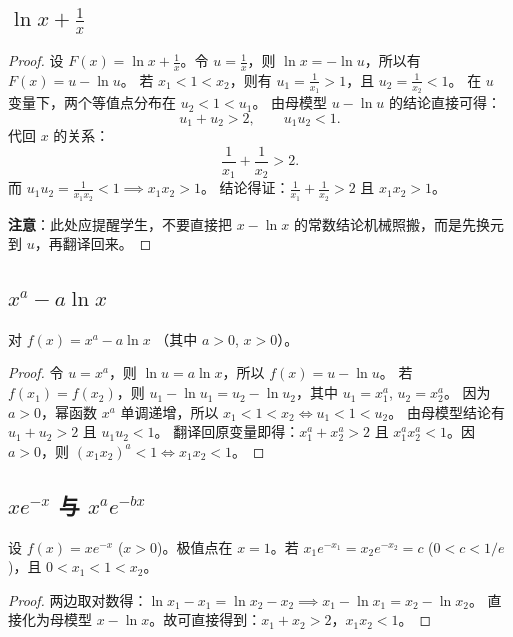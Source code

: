 \documentclass[11pt,a4paper]{ctexart}
\begin{document}
\subsection{$\ln x+\frac{1}{x}$}
\begin{proof}
设 $F(x) = \ln x + \frac{1}{x}$。令 $u=\frac{1}{x}$，则 $\ln x = -\ln u$，所以有 $F(x) = u - \ln u$。
若 $x_1 < 1 < x_2$，则有 $u_1 = \frac{1}{x_1} > 1$，且 $u_2 = \frac{1}{x_2} < 1$。
在 $u$ 变量下，两个等值点分布在 $u_2 < 1 < u_1$。
由母模型 $u-\ln u$ 的结论直接可得：
\[
u_1+u_2>2,\qquad u_1u_2<1.
\]
代回 $x$ 的关系：
\[
\frac{1}{x_1}+\frac{1}{x_2}>2.
\]
而 $u_1u_2 = \frac{1}{x_1x_2} < 1 \implies \boxed{x_1x_2>1}$。
结论得证：$\boxed{\frac{1}{x_1}+\frac{1}{x_2}>2}$ 且 $\boxed{x_1x_2>1}$。

\textbf{注意}：此处应提醒学生，不要直接把 $x-\ln x$ 的常数结论机械照搬，而是先换元到 $u$，再翻译回来。
\end{proof}

\subsection{$x^a-a\ln x$}
对 $f(x)=x^a-a\ln x$ （其中 $a>0$, $x>0$）。
\begin{proof}
令 $u=x^a$，则 $\ln u = a\ln x$，所以 $f(x) = u - \ln u$。
若 $f(x_1) = f(x_2)$，则 $u_1-\ln u_1 = u_2-\ln u_2$，其中 $u_1=x_1^a$, $u_2=x_2^a$。
因为 $a>0$，幂函数 $x^a$ 单调递增，所以 $x_1 < 1 < x_2 \Longleftrightarrow u_1 < 1 < u_2$。
由母模型结论有 $u_1+u_2 > 2$ 且 $u_1u_2 < 1$。
翻译回原变量即得：$\boxed{x_1^a+x_2^a>2}$ 且 $x_1^ax_2^a < 1$。因 $a>0$，则 $(x_1x_2)^a < 1 \Longleftrightarrow \boxed{x_1x_2<1}$。
\end{proof}

\subsection{$xe^{-x}$ 与 $x^ae^{-bx}$}
设 $f(x)=xe^{-x}$ ($x>0$)。极值点在 $x=1$。若 $x_1e^{-x_1}=x_2e^{-x_2}=c$ ($0<c<1/e$)，且 $0<x_1<1<x_2$。
\begin{proof}
两边取对数得：$\ln x_1 - x_1 = \ln x_2 - x_2 \implies x_1 - \ln x_1 = x_2 - \ln x_2$。
直接化为母模型 $x-\ln x$。故可直接得到：$\boxed{x_1+x_2>2}$，$\boxed{x_1x_2<1}$。
\end{proof}
\end{document}
